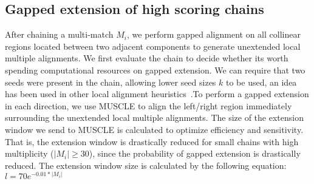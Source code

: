 \documentclass{ws-procs975x65}
\begin{document}
\subsection{Gapped extension of high scoring chains}

After chaining a multi-match $M_i$, we perform gapped alignment on all collinear regions located between two adjacent components to generate unextended local multiple alignments. We first evaluate the chain to decide whether its worth spending computational resources on gapped extension. We can require that two seeds were present in the chain, allowing lower seed sizes $k$ to be used, an idea has been used in other local alignment heuristics~\cite{ref-blastz,ref-gappedblast,ref-blat}.To perform a gapped extension in each direction, we use MUSCLE to align the left/right region immediately surrounding the unextended local multiple alignments. The size of the extension window we send to MUSCLE is calculated to optimize efficiency and sensitivity. That is, the extension window is drastically reduced for small chains with high multiplicity ($|M_{i}|\geq 30$), since the probability of gapped extension is drastically reduced. The extension window size is calculated by the following equation: $l = 70e^{-0.01*|M_{i}|}$
\end{document}
